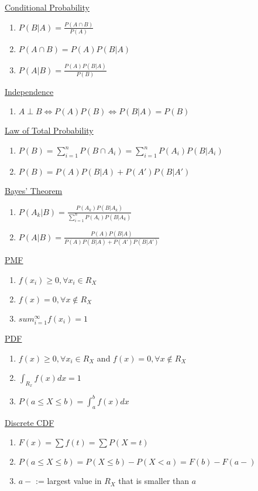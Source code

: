 \documentclass[a4paper,1pt,landscape]{article}
\begin{document}
\begin{multicols}{3}
\underline{Conditional Probability}
\begin{enumerate}
\item $P(B|A) = \frac{P(A\cap B)}{P(A)}$
\item $P(A\cap B) = P(A)P(B|A)$
\item $P(A|B) = \frac{P(A)P(B|A)}{P(B)}$
\end{enumerate}

\underline{Independence}
\begin{enumerate}
\item $A \perp B \Leftrightarrow P(A)P(B) \Leftrightarrow P(B|A) = P(B)$
\end{enumerate}

\underline{Law of Total Probability}
\begin{enumerate}
\item $P(B) = \sum_{i=1}^n P(B\cap A_i) = \sum_{i=1}^n P(A_i)P(B|A_i)$
\item $P(B) = P(A)P(B|A) + P(A')P(B|A')$
\end{enumerate}

\underline{Bayes' Theorem}
\begin{enumerate}
\item $P(A_k|B) = \frac{P(A_k)P(B|A_k)}{\sum_{i=1}^n P(A_i)P(B|A_k)}$
\item $P(A|B) = \frac{P(A)P(B|A)}{P(A)P(B|A)+P(A')P(B|A')}$
\end{enumerate}

\underline{PMF}
\begin{enumerate}
\item $f(x_i) \geq 0, \forall x_i \in R_X$
\item $f(x) = 0, \forall x \notin R_X$
\item $sum_{i=1}^\infty f(x_i) = 1$
\end{enumerate}

\underline{PDF}
\begin{enumerate}
    \item $f(x) \geq 0, \forall x_i \in R_X$ and $f(x) = 0, \forall x \notin R_X$
    \item $\int_{R_x} f(x) dx = 1$
    \item $P(a \leq X \leq b) = \int_a^b f(x) dx$
\end{enumerate}

\underline{Discrete CDF}
\begin{enumerate}
    \item $F(x) = \sum f(t) = \sum P(X=t)$
    \item $P(a \leq X \leq b) = P(X \leq b) - P(X < a) = F(b) - F(a-)$
    \item $a-$ := largest value in $R_X$ that is smaller than $a$
\end{enumerate}


\end{multicols}
\end{document}
